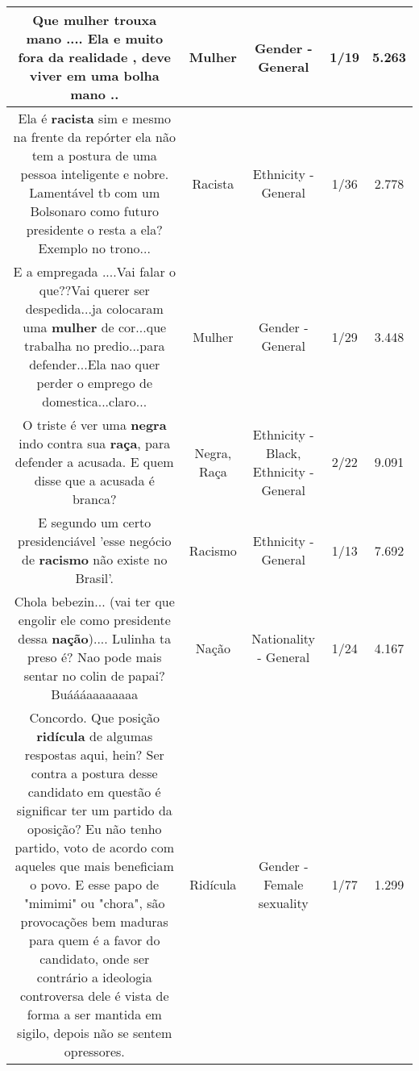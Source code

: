 \documentclass[11pt]{article}
\newlength\mylength
\begin{document}
\begin{center}
\begin{longtable}{|C{.65\mylength}|C{.30\mylength}|C{.12\mylength}|C{.12\mylength}|C{.12\mylength}|}
  \small Que \textbf{mulher} trouxa mano .... Ela e muito fora da realidade , deve viver em uma bolha mano ..\normalsize   & Mulher & Gender - General & 1/19 & 5.263 \\  \hline
  \small Ela é \textbf{racista} sim e mesmo na frente da repórter ela não tem a postura de uma pessoa inteligente e nobre. Lamentável tb com um Bolsonaro como futuro presidente o resta a ela? Exemplo no trono...\normalsize   & Racista & Ethnicity - General & 1/36 & 2.778 \\  \hline
  \small E a empregada ....Vai falar o que??Vai querer ser despedida...ja colocaram uma \textbf{mulher} de cor...que trabalha no predio...para defender...Ela nao quer perder o emprego de domestica...claro...\normalsize   & Mulher & Gender - General & 1/29 & 3.448 \\  \hline
  \small O triste é ver uma \textbf{negra} indo contra sua \textbf{raça}, para defender a acusada. E quem disse que a acusada é branca?\normalsize   & Negra, Raça & Ethnicity - Black, Ethnicity - General & 2/22 & 9.091 \\  \hline
  \small E segundo um certo presidenciável 'esse negócio de \textbf{racismo} não existe no Brasil'.\normalsize   & Racismo & Ethnicity - General & 1/13 & 7.692 \\  \hline
  \small Chola bebezin... (vai ter que engolir ele como presidente dessa \textbf{nação}).... Lulinha ta preso é? Nao pode mais sentar no colin de papai? Buáááaaaaaaaa\normalsize   & Nação & Nationality - General & 1/24 & 4.167 \\  \hline
  \small Concordo. Que posição \textbf{ridícula} de algumas respostas aqui, hein? Ser contra a postura desse candidato em questão é significar ter um partido da oposição? Eu não tenho partido, voto de acordo com aqueles que mais beneficiam o povo. E esse papo de "mimimi" ou "chora", são provocações bem maduras para quem é a favor do candidato, onde ser contrário a ideologia controversa dele é vista de forma a ser mantida em sigilo, depois não se sentem opressores.\normalsize   & Ridícula & Gender - Female sexuality & 1/77 & 1.299 \\  \hline

\end{longtable}
\end{center}
\end{document}
